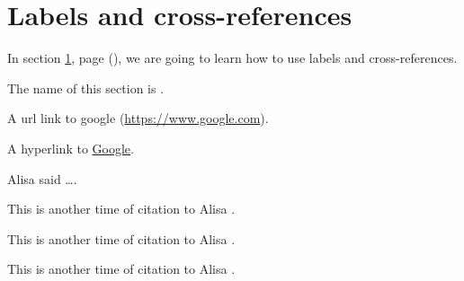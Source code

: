 
\section{Labels and cross-references} \label{s:ch3s1}

In section \ref{s:ch3s1}, page \pageref{s:ch3s1} (\emph{}), we are 
going to learn how to use labels and cross-references.

The name of this section is \textbf{}.

A url link to google (\url{https://www.google.com}). 

A hyperlink to \href{https:www.google.com}{Google}. 

Alisa \cite[page~11]{bib:alisa00} said \ldots.

\newpage

This is another time of citation to Alisa \cite{bib:alisa00}.

This is another time of citation to Alisa \cite{bib:alisa00}.

This is another time of citation to Alisa \cite{bib:alisa00}.